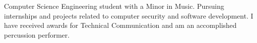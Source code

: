 %
%
%
\par{
Computer Science Engineering student with a Minor in Music. Pursuing internships and projects related to computer security and software development. I have received awards for Technical Communication and am an accomplished percussion performer. 
}